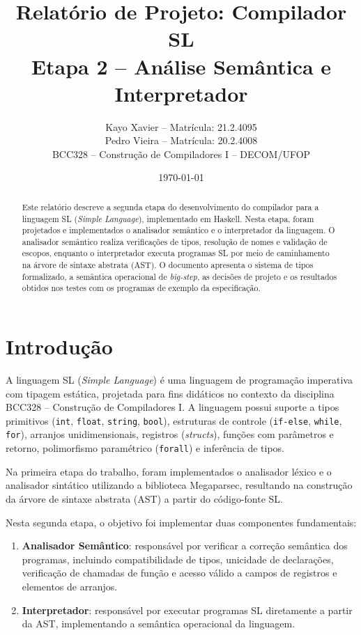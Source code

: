 \documentclass[12pt,a4paper]{article}
\title{Relatório de Projeto: Compilador SL\\Etapa 2 -- Análise Semântica e Interpretador}
\author{
    Kayo Xavier -- Matrícula: 21.2.4095 \\
    Pedro Vieira -- Matrícula: 20.2.4008 \\[0.5em]
    BCC328 -- Construção de Compiladores I -- DECOM/UFOP
}
\date{\today}
\begin{document}
\maketitle

\begin{abstract}
Este relatório descreve a segunda etapa do desenvolvimento do compilador para a linguagem SL (\textit{Simple Language}), implementado em Haskell. Nesta etapa, foram projetados e implementados o analisador semântico e o interpretador da linguagem. O analisador semântico realiza verificações de tipos, resolução de nomes e validação de escopos, enquanto o interpretador executa programas SL por meio de caminhamento na árvore de sintaxe abstrata (AST). O documento apresenta o sistema de tipos formalizado, a semântica operacional de \textit{big-step}, as decisões de projeto e os resultados obtidos nos testes com os programas de exemplo da especificação.
\end{abstract}

\tableofcontents

\newpage

\section{Introdução}

A linguagem SL (\textit{Simple Language}) é uma linguagem de programação imperativa com tipagem estática, projetada para fins didáticos no contexto da disciplina BCC328 -- Construção de Compiladores I. A linguagem possui suporte a tipos primitivos (\texttt{int}, \texttt{float}, \texttt{string}, \texttt{bool}), estruturas de controle (\texttt{if-else}, \texttt{while}, \texttt{for}), arranjos unidimensionais, registros (\textit{structs}), funções com parâmetros e retorno, polimorfismo paramétrico (\texttt{forall}) e inferência de tipos.

Na primeira etapa do trabalho, foram implementados o analisador léxico e o analisador sintático utilizando a biblioteca Megaparsec, resultando na construção da árvore de sintaxe abstrata (AST) a partir do código-fonte SL.

Nesta segunda etapa, o objetivo foi implementar duas componentes fundamentais:

\begin{enumerate}
    \item \textbf{Analisador Semântico}: responsável por verificar a correção semântica dos programas, incluindo compatibilidade de tipos, unicidade de declarações, verificação de chamadas de função e acesso válido a campos de registros e elementos de arranjos.
    \item \textbf{Interpretador}: responsável por executar programas SL diretamente a partir da AST, implementando a semântica operacional da linguagem.
\end{enumerate}
\end{document}
